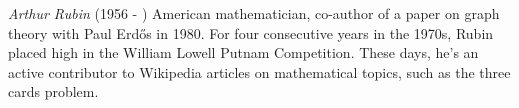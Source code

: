 \documentclass[12pt]{article}
\begin{document}
\emph{Arthur Rubin} (1956 - ) American mathematician, co-author of a paper on graph theory with Paul Erd\H{o}s in 1980. For four consecutive years in the 1970s, Rubin placed high in the William Lowell Putnam Competition. These days, he's an active contributor to Wikipedia articles on mathematical topics, such as the three cards problem.
\end{document}

